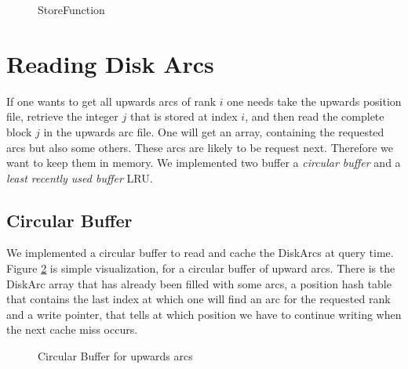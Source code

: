 \begin{figure}
    \centering
    
    \caption{StoreFunction}
    \label{fig:store_function}
\end{figure}

\section{Reading Disk Arcs}

If one wants to get all upwards arcs of rank $i$ one needs take  the upwards position file, retrieve the integer $j$ that is stored at index $i$, and then read the complete block $j$ in the upwards arc file.
One will get an array, containing the requested arcs but also some others.
These arcs are likely to be request next.
Therefore we want to keep them in memory.
We implemented two buffer a \textit{circular buffer} and a \textit{least recently used buffer} LRU.

\subsection{Circular Buffer}

We implemented a circular buffer to read and cache the DiskArcs at query time.
Figure \ref{fig:circular} is simple visualization, for a circular buffer of upward arcs.
There is the DiskArc array that has already been filled with some arcs, a position hash table that contains the last index at which one will find an arc for the requested rank and a write pointer, that tells at which position we have to continue writing when the next cache miss occurs.

\begin{figure}[H]
    \centering
    
    \caption{Circular Buffer for upwards arcs}
    \label{fig:circular}
\end{figure}

